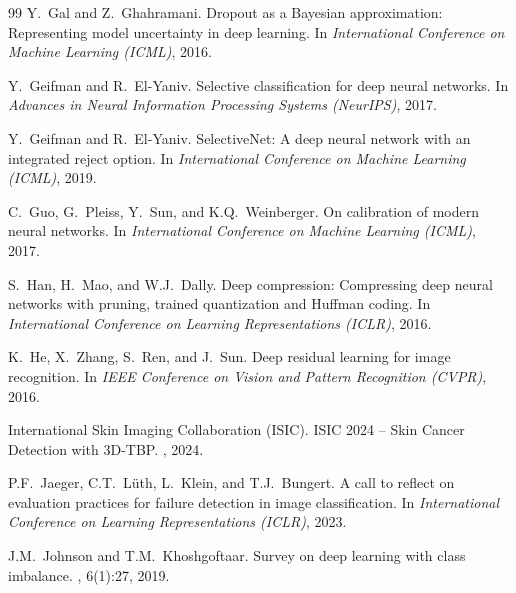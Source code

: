 \documentclass[letterpaper]{article} %
\begin{document}
\begin{thebibliography}{99}
Y.~Gal and Z.~Ghahramani.
\newblock Dropout as a Bayesian approximation: Representing model uncertainty in deep learning.
\newblock In {\em International Conference on Machine Learning (ICML)}, 2016.

Y.~Geifman and R.~El-Yaniv.
\newblock Selective classification for deep neural networks.
\newblock In {\em Advances in Neural Information Processing Systems (NeurIPS)}, 2017.

Y.~Geifman and R.~El-Yaniv.
\newblock SelectiveNet: A deep neural network with an integrated reject option.
\newblock In {\em International Conference on Machine Learning (ICML)}, 2019.

C.~Guo, G.~Pleiss, Y.~Sun, and K.Q.~Weinberger.
\newblock On calibration of modern neural networks.
\newblock In {\em International Conference on Machine Learning (ICML)}, 2017.

S.~Han, H.~Mao, and W.J.~Dally.
\newblock Deep compression: Compressing deep neural networks with pruning, trained quantization and Huffman coding.
\newblock In {\em International Conference on Learning Representations (ICLR)}, 2016.

K.~He, X.~Zhang, S.~Ren, and J.~Sun.
\newblock Deep residual learning for image recognition.
\newblock In {\em IEEE Conference on Vision and Pattern Recognition (CVPR)}, 2016.

International Skin Imaging Collaboration (ISIC).
\newblock ISIC 2024 -- Skin Cancer Detection with 3D-TBP.
, 2024.

P.F.~Jaeger, C.T.~L\"uth, L.~Klein, and T.J.~Bungert.
\newblock A call to reflect on evaluation practices for failure detection in image classification.
\newblock In {\em International Conference on Learning Representations (ICLR)}, 2023.

J.M.~Johnson and T.M.~Khoshgoftaar.
\newblock Survey on deep learning with class imbalance.
, 6(1):27, 2019.


\end{thebibliography}
\end{document}

